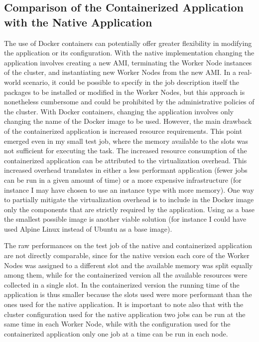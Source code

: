 \documentclass{article}
\begin{document}
\subsection{Comparison of the Containerized Application with the Native Application}
The use of Docker containers can potentially offer greater flexibility in modifying the application or its configuration.
With the native implementation changing the application involves creating a new AMI, terminating the Worker Node instances of the cluster, and instantiating new Worker Nodes from the new AMI\@.
In a real-world scenario, it could be possible to specify in the job description itself the packages to be installed or modified in the Worker Nodes, but this approach is nonetheless cumbersome and could be prohibited by the administrative policies of the cluster.
With Docker containers, changing the application involves only changing the name of the Docker image to be used.
However, the main drawback of the containerized application is increased resource requirements.
This point emerged even in my small test job, where the memory available to the slots was not sufficient for executing the task.
The increased resource consumption of the containerized application can be attributed to the virtualization overhead.
This increased overhead translates in either a less performant application (fewer jobs can be run in a given amount of time) or a more expensive infrastructure (for instance I may have chosen to use an instance type with more memory).
One way to partially mitigate the virtualization overhead is to include in the Docker image only the components that are strictly required by the application.
Using as a base the smallest possible image is another viable solution (for instance I could have used Alpine Linux instead of Ubuntu as a base image).

The raw performances on the test job of the native and containerized application are not directly comparable, since for the native version each core of the Worker Nodes was assigned to a different slot and the available memory was split equally among them, while for the containerized version all the available resources were collected in a single slot.
In the containerized version the running time of the application is thus smaller because the slots used were more performant than the ones used for the native application.
It is important to note also that with the cluster configuration used for the native application two jobs can be run at the same time in each Worker Node, while with the configuration used for the containerized application only one job at a time can be run in each node.
\end{document}
